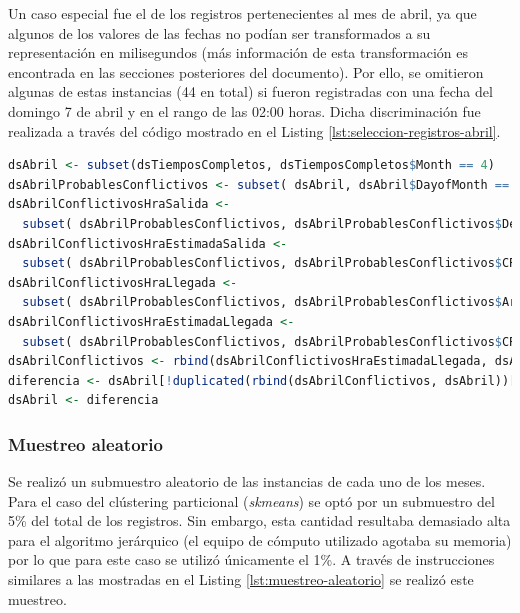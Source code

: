 \documentclass[12pt]{article}
\numberwithin{equation}{section}
\numberwithin{table}{section}
\numberwithin{figure}{section}
\begin{document}
Un caso especial fue el de los registros pertenecientes al mes de abril, ya que algunos de los valores de las fechas no podían ser transformados a su representación en milisegundos (más información de esta transformación es encontrada en las secciones posteriores del documento).
Por ello, se omitieron algunas de estas instancias (44 en total) si fueron registradas con una fecha del domingo 7 de abril y en el rango de las 02:00 horas. Dicha discriminación fue realizada a través del código mostrado en el Listing \ref{lst:seleccion-registros-abril}.
\begin{lstlisting}[language=R, caption=Separación de registros del mes de abril, label={lst:seleccion-registros-abril}]
dsAbril <- subset(dsTiemposCompletos, dsTiemposCompletos$Month == 4)
dsAbrilProbablesConflictivos <- subset( dsAbril, dsAbril$DayofMonth == 7)
dsAbrilConflictivosHraSalida <- 
  subset( dsAbrilProbablesConflictivos, dsAbrilProbablesConflictivos$DepTime >= 200 & dsAbrilProbablesConflictivos$DepTime < 300)
dsAbrilConflictivosHraEstimadaSalida <- 
  subset( dsAbrilProbablesConflictivos, dsAbrilProbablesConflictivos$CRSDepTime >= 200 & dsAbrilProbablesConflictivos$CRSDepTime < 300)
dsAbrilConflictivosHraLlegada <- 
  subset( dsAbrilProbablesConflictivos, dsAbrilProbablesConflictivos$ArrTime >= 200 & dsAbrilProbablesConflictivos$ArrTime < 300)
dsAbrilConflictivosHraEstimadaLlegada <- 
  subset( dsAbrilProbablesConflictivos, dsAbrilProbablesConflictivos$CRSArrTime >= 200 & dsAbrilProbablesConflictivos$CRSArrTime < 300)
dsAbrilConflictivos <- rbind(dsAbrilConflictivosHraEstimadaLlegada, dsAbrilConflictivosHraEstimadaSalida, dsAbrilConflictivosHraSalida, dsAbrilConflictivosHraLlegada)
diferencia <- dsAbril[!duplicated(rbind(dsAbrilConflictivos, dsAbril))[-seq_len(nrow(dsAbrilConflictivos))], ]
dsAbril <- diferencia
\end{lstlisting}

\subsubsection{Muestreo aleatorio}
Se realizó un submuestro aleatorio de las instancias de cada uno de los meses. Para el caso del clústering particional (\emph{skmeans}) se optó por un submuestro del 5\% del total de los registros.
Sin embargo, esta cantidad resultaba demasiado alta para el algoritmo jerárquico (el equipo de cómputo utilizado agotaba su memoria) por lo que para este caso se utilizó únicamente el 1\%.
A través de instrucciones similares a las mostradas en el Listing \ref{lst:muestreo-aleatorio} se realizó este muestreo.
\end{document}
